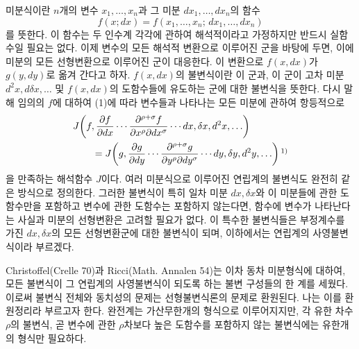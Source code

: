 미분식이란 \(n\)개의 변수 \(x_1,\ldots,x_n\)과 그 미분
\(dx_1,\ldots,dx_n\)의 함수
\[
f(x;dx)=f(x_1,\ldots,x_n;\,dx_1,\ldots,dx_n)
\]
를 뜻한다. 이 함수는 두 인수계 각각에 관하여 해석적이라고 가정하지만 반드시 실함수일 필요는 없다. 이제 변수의 모든 해석적 변환으로 이루어진 군을 바탕에 두면, 이에 미분의 모든 선형변환으로 이루어진 군이 대응한다.
이 변환으로 \(f(x,dx)\)가 \(g(y,dy)\)로 옮겨 간다고 하자. \(f(x,dx)\)의 불변식이란 이 군과, 이 군이 고차 미분 \(d^2x,d\delta x,\ldots\) 및 \(f(x,dx)\)의 도함수들에 유도하는 군에 대한 불변식을 뜻한다. 다시 말해 임의의 \(f\)에 대하여 (1)에 따라 변수들과 나타나는 모든 미분에 관하여 항등적으로
\[
\begin{aligned}
&J\!\left(f,\frac{\partial f}{\partial dx}\cdots
\frac{\partial^{\rho+\sigma}f}{\partial x^\rho\partial dx^\sigma}
\cdots dx,\delta x,d^2x,\ldots\right)\\
&\qquad =
J\!\left(g,\frac{\partial g}{\partial dy}\cdots
\frac{\partial^{\rho+\sigma}g}{\partial y^\rho\partial dy^\sigma}
\cdots dy,\delta y,d^2y,\ldots\right)\srcfnmark{1)}
\end{aligned}
\]
을 만족하는 해석함수 \(J\)이다.
여러 미분식으로 이루어진 연립계의 불변식도 완전히 같은 방식으로 정의한다. 그러한 불변식이 특히 일차 미분 \(dx,\delta x\)와 이 미분들에 관한 도함수만을 포함하고 변수에 관한 도함수는 포함하지 않는다면, 함수에 변수가 나타난다는 사실과 미분의 선형변환은 고려할 필요가 없다. 이 특수한 불변식들은 부정계수를 가진 \(dx,\delta x\)의 모든 선형변환군에 대한 불변식이 되며, 이하에서는 연립계의 사영불변식이라 부르겠다.

Christoffel(Crelle 70)과 Ricci(Math. Annalen 54)는 이차 동차 미분형식에 대하여, 모든 불변식이 그 연립계의 사영불변식이 되도록 하는 불변 구성들의 한 계를 세웠다. 이로써 불변식 전체와 동치성의 문제는 선형불변식론의 문제로 환원된다. 나는 이를 \glqq{}환원정리\grqq{}라 부르고자 한다. 완전계는 가산무한개의 형식으로 이루어지지만, 각 유한 차수 \(\rho\)의 불변식, 곧 변수에 관한 \(\rho\)차보다 높은 도함수를 포함하지 않는 불변식에는 유한개의 형식만 필요하다.

